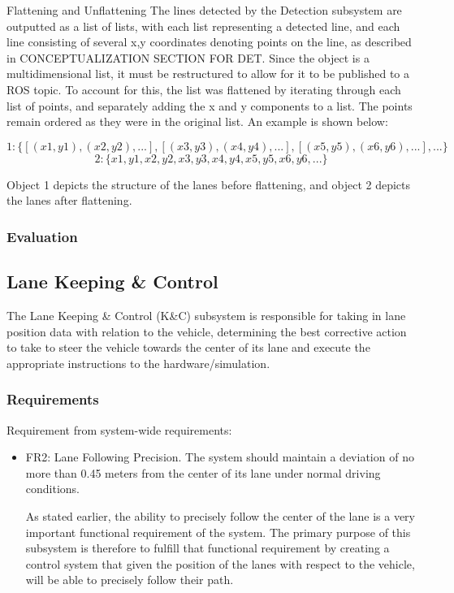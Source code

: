 \documentclass[titlepage,draft]{article}
\begin{document}
{Flattening and Unflattening
The lines detected by the Detection subsystem are outputted as a list of lists, with each list representing a detected line, and each line consisting of several x,y coordinates denoting points on the line, as described in CONCEPTUALIZATION SECTION FOR DET. Since the object is a multidimensional list, it must be restructured to allow for it to be published to a ROS topic. To account for this, the list was flattened by iterating through each list of points, and separately adding the x and y components to a list. The points remain ordered as they were in the original list. An example is shown below:

\[ 1: \{[(x1, y1), (x2, y2), ...], [(x3, y3), (x4, y4), ...], [(x5, y5), (x6, y6), ...], ...\} \]
\[ 2: \{x1, y1, x2, y2, x3, y3, x4, y4, x5, y5, x6, y6, ...\} \]

Object 1 depicts the structure of the lanes before flattening, and object 2 depicts the lanes after flattening.



\subsubsection{Evaluation}

\subsection{Lane Keeping \& Control}
The Lane Keeping \& Control (K\&C) subsystem is responsible for taking in lane position data with relation to the vehicle, determining the best corrective action to take to steer the vehicle towards the center of its lane and execute the appropriate instructions to the hardware/simulation.

\subsubsection{Requirements}
Requirement from system-wide requirements:

\begin{itemize}
	\item FR2: Lane Following Precision. The system should maintain a deviation of no more than 0.45 meters from the center of its lane under normal driving conditions.

	      As stated earlier, the ability to precisely follow the center of the lane is a very important functional requirement of the system. The primary purpose of this subsystem is therefore to fulfill that functional requirement by creating a control system that given the position of the lanes with respect to the vehicle, will be able to precisely follow their path.


\end{itemize}}
\end{document}

